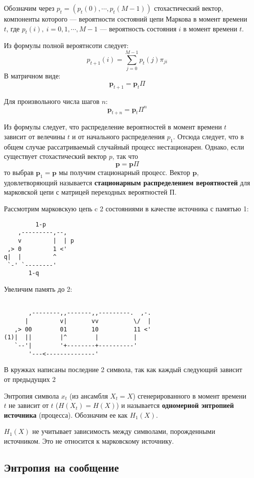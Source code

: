 Обозначим через $p_t = (p_t(0), \cdots, p_t(M-1))$ стохастический вектор,
компоненты которого --- вероятности состояний цепи Маркова в момент времени
$t$, где $p_t(i),\ i = 0, 1, \cdots, M-1$ --- вероятность состояния $i$ в
момент времени $t$.

Из формулы полной вероятнсоти следует:
\[
    p_{t+1}(i) = \sum_{j=0}^{M-1} p_t(j) \pi_{ji}
\]
В матричном виде:
\[
    \bm{p}_{t+1} = \bm{p}_t \Pi
\]

Для произвольного числа шагов $n$:
\[
    \bm{p}_{t+n} = \bm{p}_t \Pi^n
\]

Из формулы следует, что распределение вероятностей в момент времени $t$ зависит
от велечины $t$ и от начального распределения $p_1$. Отсюда следует, что в
общем случае рассатриваемый случайный процесс нестационарен. Однако, если
существует стохастический вектор $p$, так что
\[
    \bm{p} = \bm{p} \Pi
\]
то выбрав $\bm{p}_1 = \bm{p}$ мы получим стационарный процесс. Вектор $\bm{p}$,
удовлетворяющий называется \textbf{стационарным распределением вероятностей} для
марковской цепи с матрицей переходных вероятностей П.

Рассмотрим марковскую цепь c 2 состояниями в качестве источника с памятью 1:

\begin{verbatim}
         1-p
    ,---------,--,
    v         |  | p
 ,> 0         1 <'
q|  |         ^
 `-' `--------'
       1-q
\end{verbatim}

Увеличим память до 2:

\begin{verbatim}
        
       ,--------,,-------,,---------.  ,-.
      |         v|       vv          \/  |
   ,> 00        01       10          11 <'
(1)|  ||        |^        |          |
   `--'|        '+--------+----------'
       '---<--------------'
\end{verbatim}

В кружках написаны последние 2 символа, так как каждый следующий зависит от
предыдущих 2

Энтропия символа $x_t$ (из ансамбля $X_t = X$) сгенерированного в момент
времени $t$ не зависит от $t$ ($H(X_t) = H(X)$) и называется \textbf{одномерной
энтропией источника} (процесса). Обозначим ее как $H_1(X)$.

$H_1(X)$ не учитывает зависимость между символами, порожденными источником. Это
не относится к марковскому источнику.

\subsection{Энтропия на сообщение}

